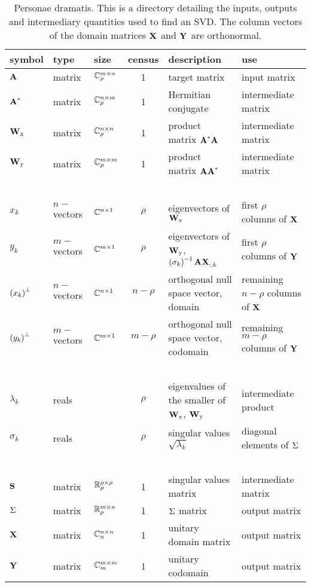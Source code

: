 \begin{landscape}
\begin{table}[p]
\begin{center}
\begin{tabular}{lllcll}
 symbol & type & size & census & description & use \\\hline
 $\textbf{A}^{\mathrm{}}$ & matrix & $\mathbb{C}^{m \times n}_{\rho}$ & 1 & target matrix  & input matrix \\
 $\textbf{A}^{\mathrm{*}}$ & matrix & $\mathbb{C}^{n \times m}_{\rho}$ & 1 & Hermitian conjugate & intermediate matrix\\ 
 $\textbf{W}_{\mathrm{x}}$ & matrix & $\mathbb{C}^{n \times n}_{\rho}$ & 1 & product matrix $\textbf{A}^{\mathrm{*}}\textbf{A}^{\mathrm{}}$ & intermediate matrix\\
 $\textbf{W}_{\mathrm{y}}$ & matrix & $\mathbb{C}^{m \times m}_{\rho}$ & 1 & product matrix $\textbf{A}^{\mathrm{}}\textbf{A}^{\mathrm{*}}$ & intermediate matrix \\
 \ &&& \\
 $x_{k}$ & $n-$vectors & $\mathbb{C}^{n \times 1}$ & $\rho$ & eigenvectors of $\textbf{W}_{\mathrm{x}}$ & first $\rho$ columns of $\textbf{X}^{\mathrm{}}$ \\
 $y_{k}$ & $m-$vectors & $\mathbb{C}^{m \times 1}$ & $\rho$ & eigenvectors of $\textbf{W}_{\mathrm{y}}$, $\left( \sigma_{k} \right)^{-1}\textbf{A}^{\mathrm{}}\textbf{X}^{\mathrm{}}_{:,k}$ & first $\rho$ columns of $\textbf{Y}^{\mathrm{}}$ \\
 $\left( x_{k} \right)^{\perp}$ & $n-$vectors & $\mathbb{C}^{n \times 1}$ & $n-\rho$ & orthogonal null space vector, domain & remaining $n-\rho$ columns of $\textbf{X}^{\mathrm{}}$ \\
 $\left( y_{k} \right)^{\perp}$ & $m-$vectors & $\mathbb{C}^{m \times 1}$ & $m-\rho$ & orthogonal null space vector, codomain & remaining $m-\rho$ columns of $\textbf{Y}^{\mathrm{}}$ \\
 \ &&& \\
 $\lambda_{k}$ & reals && $\rho$ & eigenvalues of the smaller of $\textbf{W}_{\mathrm{x}}$, $\textbf{W}_{\mathrm{y}}$ &intermediate product \\
 $\sigma_{k}$ & reals && $\rho$ & singular values $\sqrt{\lambda_{k}}$ & diagonal elements of $\Sigma^{\mathrm{}}$\\
 \ &&& \\
  $\textbf{S}^{\mathrm{}}$ & matrix & $\mathbb{R}^{\rho \times \rho}_{\rho}$ & 1 & singular values matrix & intermediate matrix \\
  $\Sigma^{\mathrm{}}$ & matrix & $\mathbb{R}^{m \times n}_{\rho}$ & 1 & $\Sigma^{\mathrm{}}$ matrix & output matrix \\
  $\textbf{X}^{\mathrm{}}$ & matrix & $\mathbb{C}^{n \times n}_{n}$ & 1 & unitary domain matrix & output matrix \\
  $\textbf{Y}^{\mathrm{}}$ & matrix & $\mathbb{C}^{m \times m}_{m}$ & 1 & unitary codomain & output matrix \\
[10pt]
\end{tabular}
\end{center}
\label{tab:3:personaedramatis}
\caption{Personae dramatis. This is a directory detailing the inputs, outputs and intermediary quantities used to find an SVD. The column vectors of the domain matrices $\textbf{X}^{\mathrm{}}$ and $\textbf{Y}^{\mathrm{}}$ are orthonormal.}
\end{table}

\end{landscape}
